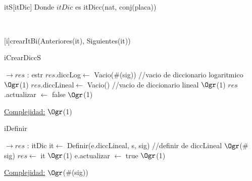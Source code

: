 \begin{Representacion}
	~
	~
	
	
	\begin{Estructura}{itS}[itDic]
		Donde $itDic$ es itDicc(nat, conj(placa))
	\end{Estructura}
	
	
	~
	~
	
	
	{crearItBi(Anteriores(it), Siguientes(it))}

\begin{Algoritmos}
	
	\begin{algorithm}[H]
		\caption{iCrearDiccS}
		\begin{algorithmic}[1]
			 $\to res$ : estr
			\State $res$.diccLog$\leftarrow$ Vacio($\#$(sig)) //vacio de diccionario logaritmico \Comment $\Ogr$(1)
			\State $res$.diccLineal$\leftarrow$ Vacio() //vacio de diccionario lineal \Comment $\Ogr$(1)
			\State $res$.actualizar $\leftarrow$ false \Comment $\Ogr$(1) 
			\EndProcedure
		\end{algorithmic}
		\underline{Complejidad:} $\Ogr$(1)
	\end{algorithm}
	
	\begin{algorithm}[H]
		\caption{iDefinir}
		\begin{algorithmic}[1]
			 $\to res$ : itDic
			\State it$\leftarrow$ Definir(e.diccLineal, s, sig) //definir de diccLineal \Comment $\Ogr$($\#$sig)
			\State $res \leftarrow$ it \Comment $\Ogr$(1)
			\State e.actualizar $\leftarrow$ true \Comment $\Ogr$(1) 
			\EndProcedure
		\end{algorithmic}
		\underline{Complejidad:} $\Ogr$($\#$(sig))
	\end{algorithm}


\end{Algoritmos}
\end{Representacion}

